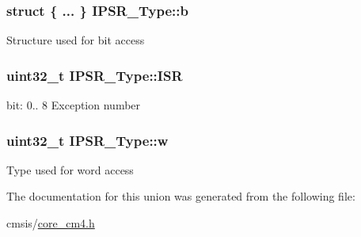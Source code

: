 \subsubsection[{\texorpdfstring{b}{b}}]{\setlength{\rightskip}{0pt plus 5cm}struct \{ ... \}   I\+P\+S\+R\+\_\+\+Type\+::b}\hypertarget{union_i_p_s_r___type_add0d6497bd50c25569ea22b48a03ec50}{}\label{union_i_p_s_r___type_add0d6497bd50c25569ea22b48a03ec50}
Structure used for bit access 
\subsubsection[{\texorpdfstring{I\+SR}{ISR}}]{\setlength{\rightskip}{0pt plus 5cm}uint32\+\_\+t I\+P\+S\+R\+\_\+\+Type\+::\+I\+SR}\hypertarget{union_i_p_s_r___type_ab46e5f1b2f4d17cfb9aca4fffcbb2fa5}{}\label{union_i_p_s_r___type_ab46e5f1b2f4d17cfb9aca4fffcbb2fa5}
bit\+: 0.. 8 Exception number 
\subsubsection[{\texorpdfstring{w}{w}}]{\setlength{\rightskip}{0pt plus 5cm}uint32\+\_\+t I\+P\+S\+R\+\_\+\+Type\+::w}\hypertarget{union_i_p_s_r___type_a4adca999d3a0bc1ae682d73ea7cfa879}{}\label{union_i_p_s_r___type_a4adca999d3a0bc1ae682d73ea7cfa879}
Type used for word access 

The documentation for this union was generated from the following file\+:\begin{DoxyCompactItemize}
\item 
cmsis/\hyperlink{core__cm4_8h}{core\+\_\+cm4.\+h}\end{DoxyCompactItemize}
